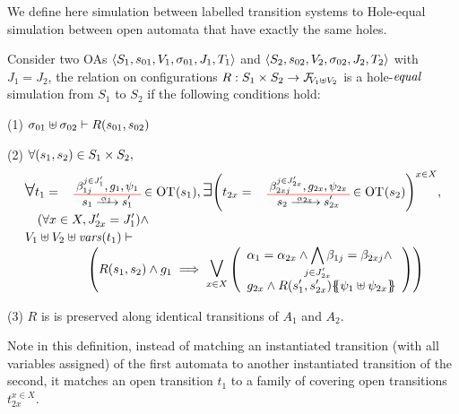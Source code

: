 \documentclass[runningheads]{llncs}
\newcommand{\symb}[1]{\makebox{\it #1}}
\begin{document}
We define here simulation between labelled transition systems to Hole-equal simulation  between  open automata that have exactly the same holes.
\begin{definition}
Consider two OAs \(\OAg[1]\) and \(\OAg[2]\) with  \(J_1 = J_2\), the relation on configurations \(R: S_1 \times S_2 \to \rformulas[V_1 \uplus V_2]\) is a hole-\(\symb{equal}\) simulation from $S_1$ to $S_2$ if the following conditions hold: 
\item[(1)] \(\sigma_{01} \uplus \sigma_{02} \vdash R\mpar{s_{01}, s_{02}}\)
\item[(2)] \(\forall \mpar{s_1, s_2} \in S_1 \times S_2,\)\vspace{-8pt}
\noindent\begin{multline*}
\everymath{\displaystyle}\begin{array}{l}
		\bigsymb{\forall} t_1 = \OTx{1}{}{1}{1} \in \fOT{s_1}, \bigsymb{\exists} \mpar{t_{2x} = \OTx{2}{x}{2x}{2x} \in \fOT{s_2}}^{x \in X}, \\[10pt]
		\quad \mpar{\forall x \in X, J'_{2x}= J'_1} \nwedge\\[2pt]
		 V_1 \uplus V_2 \uplus \fvars{t_1} \vdash\\
\hspace{5em} \left( R\mpar{s_1, s_2} \wedge g_1 \implies \operatorname*{\bigsymb{\bigvee}}_{x \in X} \mpar{\begin{array}{l}
			\alpha_1 = \alpha_{2x} \wedge \bigwedge_\subbox{j \in J'_{2x}} \beta_{1j} = \beta_{2xj} \nwedge\\[12pt]
			 g_{2x} \wedge R\mpar{s'_1, s'_{2x}}\psubst{\psi_1 \uplus \psi_{2x}}
		\end{array}}\right)
	\end{array} 
\end{multline*}
\item[(3)] $R$ is  is preserved along identical transitions of \(A_1\) and \(A_2\).
\end{definition}


Note in this definition, instead of matching an instantiated transition (with all variables assigned) of the first automata to another instantiated transition of the second, it matches an open transition $t_1$ to a family of covering open transitions $t_{2x}^{x\in X}$. %
\end{document}
